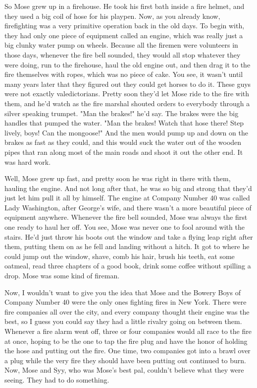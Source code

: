 So Mose grew up in a firehouse. He took his first bath inside a fire helmet, and they used a big coil of hose for his playpen. Now, as you already know, firefighting was a very primitive operation back in the old days. To begin with, they had only one piece of equipment called an engine, which was really just a big clunky water pump on wheels. Because all the firemen were volunteers in those days, whenever the fire bell sounded, they would all stop whatever they were doing, run to the firehouse, haul the old engine out, and then drag it to the fire themselves with ropes, which was no piece of cake. You see, it wasn't until many years later that they figured out they could get horses to do it. These guys were not exactly valedictorians. Pretty soon they'd let Mose ride to the fire with them, and he'd watch as the fire marshal shouted orders to everybody through a silver speaking trumpet. "Man the brakes!" he'd say. The brakes were the big handles that pumped the water. "Man the brakes! Watch that hose there! Step lively, boys! Can the mongoose!" And the men would pump up and down on the brakes as fast as they could, and this would suck the water out of the wooden pipes that ran along most of the main roads and shoot it out the other end. It was hard work.

Well, Mose grew up fast, and pretty soon he was right in there with them, hauling the engine. And not long after that, he was so big and strong that they'd just let him pull it all by himself. The engine at Company Number 40 was called Lady Washington, after George's wife, and there wasn't a more beautiful piece of equipment anywhere. Whenever the fire bell sounded, Mose was always the first one ready to haul her off. You see, Mose was never one to fool around with the stairs. He'd just throw his boots out the window and take a flying leap right after them, putting them on as he fell and landing without a hitch. It got to where he could jump out the window, shave, comb his hair, brush his teeth, eat some oatmeal, read three chapters of a good book, drink some coffee without spilling a drop. Mose was some kind of fireman.

Now, I wouldn't want to give you the idea that Mose and the Bowery Boys of Company Number 40 were the only ones fighting fires in New York. There were fire companies all over the city, and every company thought their engine was the best, so I guess you could say they had a little rivalry going on between them. Whenever a fire alarm went off, three or four companies would all race to the fire at once, hoping to be the one to tap the fire plug and have the honor of holding the hose and putting out the fire. One time, two companies got into a brawl over a plug while the very fire they should have been putting out continued to burn. Now, Mose and Syy, who was Mose's best pal, couldn't believe what they were seeing. They had to do something.

